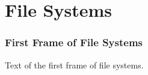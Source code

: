\section{File Systems}

\begin{frame}
    \frametitle{First Frame of File Systems}
    
    Text of the first frame of file systems.

\end{frame}
